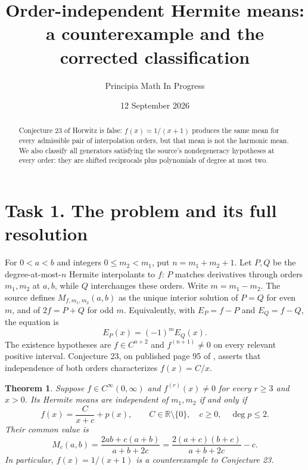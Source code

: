 \documentclass[11pt]{article}
\title{Order-independent Hermite means:\\a counterexample and the corrected classification}
\author{Principia Math In Progress}
\date{12 September 2026}
\newtheorem{theorem}{Theorem}
\newcommand{\R}{\mathbb R}
\begin{document}
\maketitle
\begin{abstract}
Conjecture 23 of Horwitz is false: $f(x)=1/(x+1)$ produces the same
mean for every admissible pair of interpolation orders, but that mean
is not the harmonic mean. We also classify all generators satisfying
the source's nondegeneracy hypotheses at every order: they are shifted
reciprocals plus polynomials of degree at most two.
\end{abstract}

\section*{Task 1. The problem and its full resolution}
For $0<a<b$ and integers $0\le m_2<m_1$, put
$n=m_1+m_2+1$. Let $P,Q$ be the degree-at-most-$n$ Hermite
interpolants to $f$: $P$ matches derivatives through orders $m_1,m_2$
at $a,b$, while $Q$ interchanges these orders. Write $m=m_1-m_2$.
The source defines $M_{f,m_1,m_2}(a,b)$ as the unique interior solution of
$P=Q$ for even $m$, and of $2f=P+Q$ for odd $m$.
Equivalently, with $E_P=f-P$ and $E_Q=f-Q$, the equation is
\begin{equation}\label{eq:errors}
 E_P(x)=(-1)^m E_Q(x).
\end{equation}
The existence hypotheses are $f\in C^{n+2}$ and
$f^{(n+1)}\ne0$ on every relevant positive interval.
Conjecture 23, on published page 95 of \cite{horwitz}, asserts that
independence of both orders characterizes $f(x)=C/x$.

\begin{theorem}\label{thm:classification}
Suppose $f\in C^\infty(0,\infty)$ and
$f^{(r)}(x)\ne0$ for every $r\ge3$ and $x>0$.
Its Hermite means are independent of $m_1,m_2$ if and only if
\begin{equation}\label{eq:family}
 f(x)=\frac{C}{x+c}+p(x),\qquad
 C\in\R\setminus\{0\},\quad c\ge0,\quad \deg p\le2.
\end{equation}
Their common value is
\begin{equation}\label{eq:mean}
 M_c(a,b)=\frac{2ab+c(a+b)}{a+b+2c}
 =\frac{2(a+c)(b+c)}{a+b+2c}-c.
\end{equation}
In particular, $f(x)=1/(x+1)$ is a counterexample to Conjecture 23.
\end{theorem}
\end{document}
